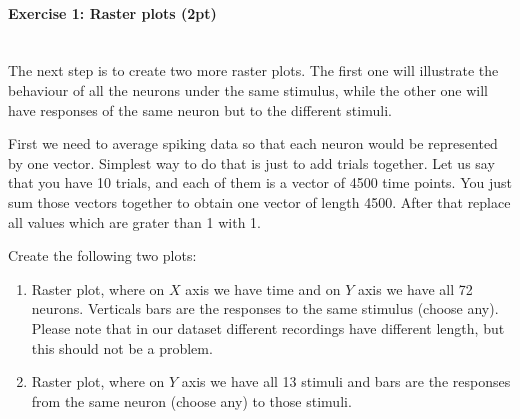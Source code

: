 \documentclass[a4paper,11pt]{article}
\newenvironment{exercise}[3]{\paragraph{Exercise #1: #2 (#3pt)}\ \\}{
\medskip}
\begin{document}
\begin{exercise}{1}{Raster plots}{2}
The next step is to create two more raster plots. The first one will illustrate the behaviour of all the neurons under the same stimulus, while the other one will have responses of the same neuron but to the different stimuli.

First we need to average spiking data so that each neuron would be represented by one vector. Simplest way to do that is just to add trials together. Let us say that you have 10 trials, and each of them is a vector of 4500 time points. You just sum those vectors together to obtain one vector of length 4500. After that replace all values which are grater than 1 with 1.

Create the following two plots:
\begin{enumerate}
	\item Raster plot, where on $X$ axis we have time and on $Y$ axis we have all 72 neurons. Verticals bars are the responses to the same stimulus (choose any). Please note that in our dataset different recordings have different length, but this should not be a problem.
	\item Raster plot, where on $Y$ axis we have all 13 stimuli and bars are the responses from the same neuron (choose any) to those stimuli.
\end{enumerate}
\end{exercise}
\end{document}

